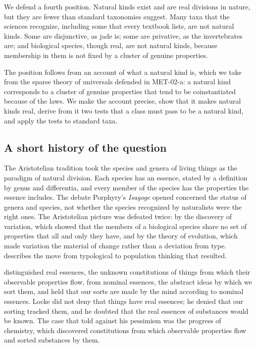 \documentclass{situationist-preprint}
\begin{document}
We defend a fourth position. Natural kinds exist and are real divisions in nature, but they are fewer than standard taxonomies suggest. Many taxa that the sciences recognize, including some that every textbook lists, are not natural kinds. Some are disjunctive, as jade is; some are privative, as the invertebrates are; and biological species, though real, are not natural kinds, because membership in them is not fixed by a cluster of genuine properties.

The position follows from an account of what a natural kind is, which we take from the sparse theory of universals defended in MET-02-a: a natural kind corresponds to a cluster of genuine properties that tend to be coinstantiated because of the laws. We make the account precise, show that it makes natural kinds real, derive from it two tests that a class must pass to be a natural kind, and apply the tests to standard taxa.

\subsection{A short history of the question}\label{s:history}

The Aristotelian tradition took the species and genera of living things as the paradigm of natural division. Each species has an essence, stated by a definition by genus and differentia, and every member of the species has the properties the essence includes. The debate Porphyry's \emph{Isagoge} opened concerned the status of genera and species, not whether the species recognized by naturalists were the right ones. The Aristotelian picture was defeated twice: by the discovery of variation, which showed that the members of a biological species share no set of properties that all and only they have, and by the theory of evolution, which made variation the material of change rather than a deviation from type. \citet{Sober1980} describes the move from typological to population thinking that resulted.

\citet[III.vi]{LockeEssay} distinguished real essences, the unknown constitutions of things from which their observable properties flow, from nominal essences, the abstract ideas by which we sort them, and held that our sorts are made by the mind according to nominal essences. Locke did not deny that things have real essences; he denied that our sorting tracked them, and he doubted that the real essences of substances would be known. The case that told against his pessimism was the progress of chemistry, which discovered constitutions from which observable properties flow and sorted substances by them.
\end{document}
